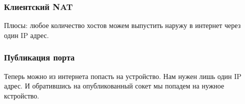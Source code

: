 \documentclass[10pt,a4paper,oneside,titlepage]{report}
\theoremstyle{defenition}
\begin{document}

\subsubsection{Клиентский NAT}



Плюсы: любое количество хостов можем выпустить наружу в интернет через один IP адрес.

\subsubsection{Публикация порта}

Теперь можно из интернета попасть на устройство. Нам нужен лишь один IP адрес. И обратившись на опубликованный сокет мы попадем на нужное кстройство. 
\end{document}
